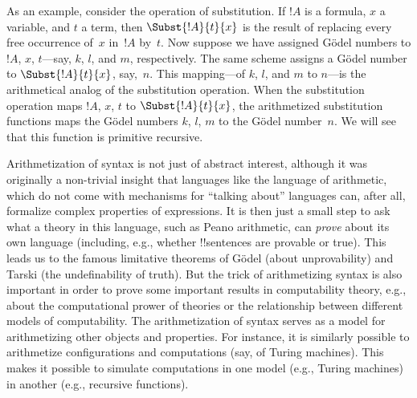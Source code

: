 \documentclass[../../../include/open-logic-section]{subfiles}
\begin{document}
As an example, consider the operation of substitution. If $!A$ is a
formula, $x$ a variable, and $t$ a term, then $\Subst{!A}{t}{x}$ is
the result of replacing every free occurrence of~$x$ in~$!A$ by~$t$.
Now suppose we have assigned G\"odel numbers to $!A$, $x$, $t$---say,
$k$, $l$, and $m$, respectively.  The same scheme assigns a G\"odel
number to $\Subst{!A}{t}{x}$, say,~$n$.  This mapping---of $k$, $l$,
and $m$ to $n$---is the arithmetical analog of the substitution
operation. When the substitution operation maps $!A$, $x$, $t$ to
$\Subst{!A}{t}{x}$, the arithmetized substitution functions maps the
G\"odel numbers $k$, $l$, $m$ to the G\"odel number~$n$.  We will see
that this function is primitive recursive.

Arithmetization of syntax is not just of abstract interest, although
it was originally a non-trivial insight that languages like the
language of arithmetic, which do not come with mechanisms for
``talking about'' languages can, after all, formalize complex
properties of expressions.  It is then just a small step to ask what a
theory in this language, such as Peano arithmetic, can \emph{prove}
about its own language (including, e.g., whether !!{sentence}s are
provable or true).  This leads us to the famous limitative theorems of
G\"odel (about unprovability) and Tarski (the undefinability of
truth). But the trick of arithmetizing syntax is also important in
order to prove some important results in computability theory, e.g.,
about the computational prower of theories or the relationship between
different models of computability.  The arithmetization of syntax
serves as a model for arithmetizing other objects and properties. For
instance, it is similarly possible to arithmetize configurations and
computations (say, of Turing machines). This makes it possible to
simulate computations in one model (e.g., Turing machines) in another
(e.g., recursive functions).
\end{document}
